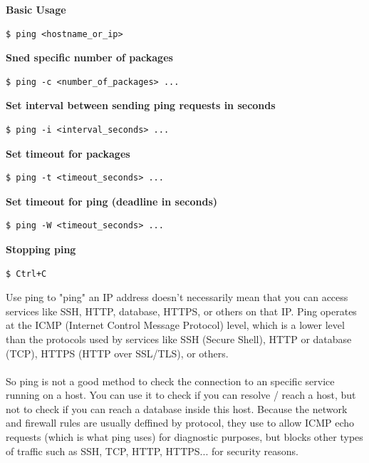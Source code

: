 \documentclass{article}
\newenvironment{blocktemplateIII}[1]{%
    \tcolorbox[beamer,%
    noparskip,breakable,
    ,colframe=Red,%
    colbacklower=LimeGreen!75!LightGreen,%
    title=#1]}%
    {\endtcolorbox}
\newenvironment{codetemplate}[1][]{%
  \mybasecolorbox[#1]
  \itshape
}{%
  \endmybasecolorbox
}
\begin{document}
\textbf{Basic Usage}
\begin{codetemplate}{}
\begin{verbatim}
$ ping <hostname_or_ip>
\end{verbatim}
\end{codetemplate}

\textbf{Sned specific number of packages}
\begin{codetemplate}{}
\begin{verbatim}
$ ping -c <number_of_packages> ...
\end{verbatim}
\end{codetemplate}

\textbf{Set interval between sending ping requests in seconds}
\begin{codetemplate}{}
\begin{verbatim}
$ ping -i <interval_seconds> ...
\end{verbatim}
\end{codetemplate}

\textbf{Set timeout for packages}
\begin{codetemplate}{}
\begin{verbatim}
$ ping -t <timeout_seconds> ...
\end{verbatim}
\end{codetemplate}

\textbf{Set timeout for ping (deadline in seconds)}
\begin{codetemplate}{}
\begin{verbatim}
$ ping -W <timeout_seconds> ...
\end{verbatim}
\end{codetemplate}

\textbf{Stopping ping}
\begin{codetemplate}{}
\begin{verbatim}
$ Ctrl+C
\end{verbatim}
\end{codetemplate}

\begin{blocktemplateIII}{WARNING}
Use ping to "ping" an IP address doesn't necessarily mean that you can access services like SSH, HTTP, database, HTTPS, or others on that IP. Ping operates at the ICMP (Internet Control Message Protocol) level, which is a lower level than the protocols used by services like SSH (Secure Shell), HTTP or database (TCP), HTTPS (HTTP over SSL/TLS), or others.
\\\\
So ping is not a good method to check the connection to an specific service running on a host. You can use it to check if you can resolve / reach a host, but not to check if you can reach a database inside this host. Because the network and firewall rules are usually deffined by protocol, they use to allow ICMP echo requests (which is what ping uses) for diagnostic purposes, but blocks other types of traffic such as SSH, TCP, HTTP, HTTPS... for security reasons. 
\end{blocktemplateIII}
\end{document}
